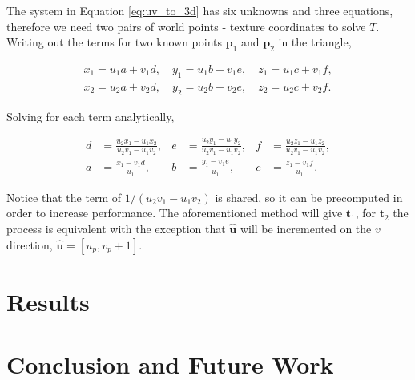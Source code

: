 \documentclass[12pt]{article}
\begin{document}
The system in Equation \ref{eq:uv_to_3d} has six unknowns and three equations, therefore we need two pairs of world points - texture coordinates to solve $T$.
Writing out the terms for two known points $\mathbf{p}_1$ and $\mathbf{p}_2$ in the triangle,

\begin{equation}
\begin{split}
x_1 = u_1 a + v_1 d, \quad y_1 = u_1 b + v_1 e, \quad z_1 = u_1 c + v_1 f,\\
x_2 = u_2 a + v_2 d, \quad y_2 = u_2 b + v_2 e, \quad z_2 = u_2 c + v_2 f.
\end{split}
\end{equation}

Solving for each term analytically,

\begin{align}
d& = \frac{u_2 x_1 - u_1 x_2}{u_2 v_1 - u_1 v_2},& e& = \frac{u_2 y_1 - u_1 y_2}{u_2 v_1 - u_1 v_2},& f& = \frac{u_2 z_1 - u_1 z_2}{u_2 v_1 - u_1 v_2}, \\
a& = \frac{x_1 - v_1 d}{u_1},& b& = \frac{y_1 - v_1 e}{u_1},&  c& = \frac{z_1 - v_1 f}{u_1}.
\end{align}

Notice that the term of $1/(u_2 v_1 - u_1 v_2)$ is shared, so it can be precomputed in order to increase performance.
The aforementioned method will give $\mathbf{t}_1$, for $\mathbf{t}_2$ the process is equivalent with the exception that $\hat{\mathbf{u}}$ will be incremented on the $v$ direction, $\hat{\mathbf{u}} = \left[ u_p, v_p + 1\right]$.

\section{Results}

\section{Conclusion and Future Work}



\end{document}
